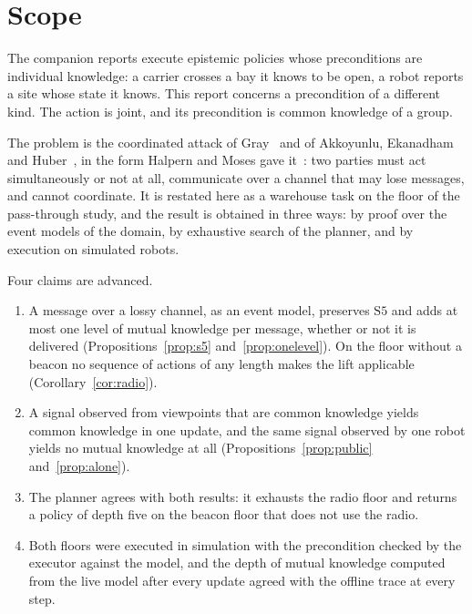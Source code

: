 \documentclass[11pt,a4paper]{article}
\theoremstyle{definition}
\begin{document}
\tableofcontents
\newpage

\section{Scope}
\label{sec:scope}

The companion reports execute epistemic policies whose preconditions are
individual knowledge: a carrier crosses a bay it knows to be open, a robot
reports a site whose state it knows. This report concerns a precondition of a
different kind. The action is joint, and its precondition is common knowledge
of a group.

The problem is the coordinated attack of Gray~\cite{gray1978} and of Akkoyunlu,
Ekanadham and Huber~\cite{akkoyunlu1975}, in the form Halpern and Moses gave
it~\cite{halpern1990}: two parties must act simultaneously or not at all,
communicate over a channel that may lose messages, and cannot coordinate. It is
restated here as a warehouse task on the floor of the pass-through study, and
the result is obtained in three ways: by proof over the event models of the
domain, by exhaustive search of the planner, and by execution on simulated
robots.

Four claims are advanced.

\begin{enumerate}[leftmargin=1.4em, itemsep=2pt]
  \item A message over a lossy channel, as an event model, preserves
        $\mathrm{S5}$ and adds at most one level of mutual knowledge per
        message, whether or not it is delivered
        (Propositions~\ref{prop:s5} and~\ref{prop:onelevel}). On the floor
        without a beacon no sequence of actions of any length makes the lift
        applicable (Corollary~\ref{cor:radio}).
  \item A signal observed from viewpoints that are common knowledge yields
        common knowledge in one update, and the same signal observed by one
        robot yields no mutual knowledge at all
        (Propositions~\ref{prop:public} and~\ref{prop:alone}).
  \item The planner agrees with both results: it exhausts the radio floor and
        returns a policy of depth five on the beacon floor that does not use
        the radio.
  \item Both floors were executed in simulation with the precondition checked
        by the executor against the model, and the depth of mutual knowledge
        computed from the live model after every update agreed with the
        offline trace at every step.
\end{enumerate}
\end{document}
